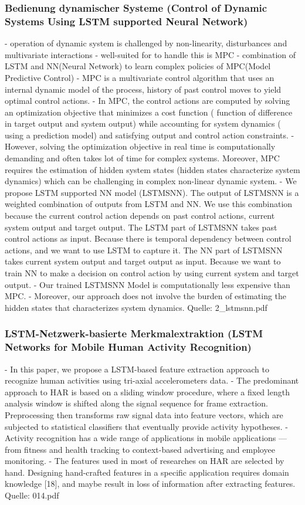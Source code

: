 {\subsubsection{Bedienung dynamischer Systeme (Control of Dynamic Systems Using LSTM supported Neural Network)}
- operation of dynamic system is challenged by non-linearity, disturbances and multivariate interactions
	- well-suited for to handle this is MPC
- combination of LSTM and NN(Neural Network) to learn complex policies of MPC(Model Predictive Control)
- MPC is a multivariate control algorithm that uses an internal dynamic model of the process, history of past control moves to yield optimal control actions.
	- In MPC, the control actions are computed by solving an optimization objective that minimizes a cost function ( function of difference in target output and system output) while accounting for system dynamics ( using a prediction model) and satisfying output and control action constraints.
	- However, solving the optimization objective in real time is computationally demanding and often takes lot of time for complex systems. Moreover, MPC requires the estimation of hidden system states (hidden states characterize system dynamics) which can be challenging in complex non-linear dynamic system.
- We propose LSTM supported NN model (LSTMSNN). The output of LSTMSNN is a weighted combination of outputs from LSTM and NN. We use this combination because the current control action depends on past control actions, current system output and target output. The LSTM part of LSTMSNN takes past control actions as input. Because there is temporal dependency between control actions, and we want to use LSTM to capture it. The NN part of LSTMSNN takes current system output and target output as input. Because we want to train NN to make a decision on control action by using current system and target output.
	- Our trained LSTMSNN Model is computationally less expensive than MPC.
	- Moreover, our approach does not involve the burden of estimating the hidden states that characterizes system dynamics.
Quelle: 2\_lstmsnn.pdf

\subsubsection{LSTM-Netzwerk-basierte Merkmalextraktion (LSTM Networks for Mobile Human Activity Recognition)}
- In this paper, we propose a LSTM-based feature extraction approach to recognize human activities using tri-axial accelerometers data.
- The predominant approach to HAR is based on a sliding window procedure, where a fixed length analysis window is shifted along the signal sequence for frame extraction. Preprocessing then transforms raw signal data into feature vectors, which are subjected to statistical classifiers that eventually provide activity hypotheses.
- Activity recognition has a wide range of applications in mobile applications — from fitness and health tracking to context-based advertising and employee monitoring.
- The features used in most of researches on HAR are selected by hand. Designing hand-crafted features in a specific application requires domain knowledge [18], and maybe result in loss of information after extracting features.
Quelle: 014.pdf

}
